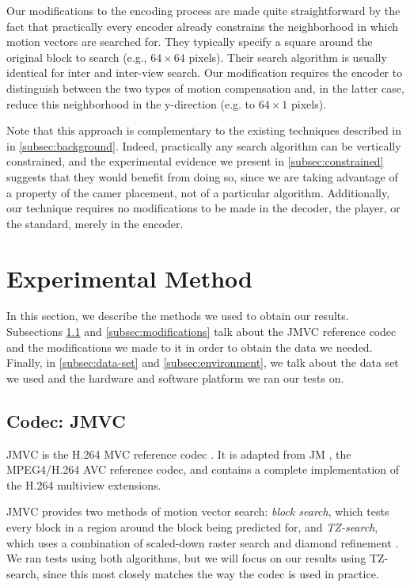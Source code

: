 \documentclass{sig-alternate-05-2015}
\begin{document}
Our modifications to the encoding process are made quite straightforward by the
fact that practically every encoder already constrains the neighborhood in which
motion vectors are searched for. They typically specify a square around the
original block to search (e.g., $64\times 64$ pixels). Their search algorithm is
usually identical for inter and inter-view search. Our modification requires the
encoder to distinguish between the two types of motion compensation and, in the
latter case, reduce this neighborhood in the y-direction (e.g. to $64\times 1$
pixels).

Note that this approach is complementary to the existing techniques described in
in \ref{subsec:background}. Indeed, practically any search algorithm can be
vertically constrained, and the experimental evidence we present in
\ref{subsec:constrained} suggests that they would benefit from doing so, since
we are taking advantage of a property of the camer placement, not of a
particular algorithm. Additionally, our technique requires no modifications to
be made in the decoder, the player, or the standard, merely in the encoder.

\section{Experimental Method} %
\label{sec:method} %
In this section, we describe the methods we used to obtain our results.
Subsections \ref{subsec:jmvc} and \ref{subsec:modifications} talk about the JMVC
reference codec and the modifications we made to it in order to obtain the data
we needed. Finally, in \ref{subsec:data-set} and \ref{subsec:environment}, we
talk about the data set we used and the hardware and software platform we ran
our tests on.

\subsection{Codec: JMVC} %
\label{subsec:jmvc} %
JMVC is the H.264 MVC reference codec \cite{schwarz:jmvc}. It is adapted from
JM \cite{suehring:jm}, the MPEG4/H.264 AVC reference codec, and contains a
complete implementation of the H.264 multiview extensions.

JMVC provides two methods of motion vector search: {\it block search}, which
tests every block in a region around the block being predicted for, and {\it
TZ-search}, which uses a combination of scaled-down raster search and diamond
refinement \cite{purnachand:improvements}. We ran tests using both algorithms,
but we will focus on our results using TZ-search, since this most closely
matches the way the codec is used in practice.
\end{document}
